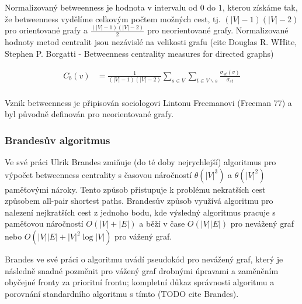 \documentclass[12pt,titlepage]{report}
\begin{document}
Normalizovaný betweenness je hodnota v intervalu od $0$ do $1$, kterou získáme
tak, že betweenness vydělíme celkovým počtem možných cest, tj. $(|V| - 1)(|V| -
2)$ pro orientované grafy a $\frac{(|V| - 1)(|V| - 2)}{2}$ pro neorientované
grafy. Normalizované hodnoty metod centralit jsou nezávislé na velikosti grafu
(cite Douglas R. WHite, Stephen P. Borgatti - Betweenness centrality measures
for directed graphs)

\begin{align*}
C_b(v) &= \frac{1}{(|V| - 1)(|V| - 2)} \displaystyle\sum\limits_{s \in V} \displaystyle\sum\limits_{t \in V \backslash s} \frac{\sigma_{st}(v)}{\sigma_{st}} \\
\end{align*}

Vznik betweenness je připisován sociologovi Lintonu Freemanovi (Freeman 77) a byl původně definován pro neorientované grafy.

\subsubsection{Brandesův algoritmus}
Ve své práci Ulrik Brandes zmiňuje (do té doby nejrychlejší) algoritmus pro
výpočet betweenness centrality s časovou náročností $\theta(|V|^3)$ a
$\theta(|V|^2)$ paměťovými nároky. Tento způsob přistupuje k problému
nekratších cest způsobem all-pair shortest paths. Brandesův způsob využívá
algoritmu pro nalezení nejkratších cest z jednoho bodu, kde výsledný algoritmus
pracuje s paměťovou náročností $O(|V| + |E|)$ a běží v čase $O(|V||E|)$ pro
nevážený graf nebo $O(|V||E| + |V|^2 \log|V|)$ pro vážený graf. 


Brandes ve své práci o algoritmu uvádí pseudokód pro nevážený graf, který je
následně snadné pozměnit pro vážený graf drobnými úpravami a zaměněním obyčejné
fronty za prioritní frontu; kompletní důkaz správnosti algoritmu a porovnání
standardního algoritmu s tímto (TODO cite Brandes).
\end{document}
